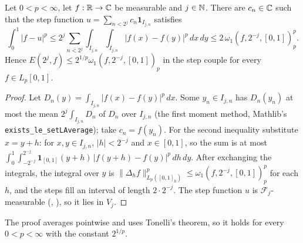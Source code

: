 \begin{lemma}
\label{lem:step-jackson-below-one}
\leanok
{}
Let $0 < p < \infty$, let $f : \mathbb{R} \to \mathbb{C}$ be measurable and $j \in \mathbb{N}$. There are $c_n \in \mathbb{C}$
such that the step function $u = \sum_{n < 2^j} c_n \mathbf{1}_{I_{j,n}}$ satisfies
\[
  \int_0^1 |f - u|^p \leq 2^j \sum_{n < 2^j} \int_{I_{j,n}} \int_{I_{j,n}} |f(x) - f(y)|^p
  \, dx \, dy \leq 2 \, \omega_1(f, 2^{-j}, [0, 1])_p^p .
\]
Hence $E(2^j, f) \leq 2^{1/p} \omega_1(f, 2^{-j}, [0, 1])_p$ in the step couple for every
$f \in L_p[0, 1]$.
\end{lemma}

\begin{proof}
\leanok
Let $D_n(y) = \int_{I_{j,n}} |f(x) - f(y)|^p \, dx$. Some $y_n \in I_{j,n}$ has $D_n(y_n)$ at most
the mean $2^j \int_{I_{j,n}} D_n$ of $D_n$ over $I_{j,n}$ (the first moment method, Mathlib's
\texttt{exists\_\allowbreak le\_\allowbreak setLAverage}); take $c_n = f(y_n)$. For the second
inequality substitute $x = y + h$: for $x, y \in I_{j,n}$, $|h| < 2^{-j}$ and $x \in [0, 1]$, so
the sum is at most
$\int_0^1 \int_{-2^{-j}}^{2^{-j}} \mathbf{1}_{[0, 1]}(y + h) \, |f(y + h) - f(y)|^p \, dh \, dy$.
After exchanging the integrals, the integral over $y$ is $\|\Delta_h f\|_{L_p([0, 1]_h)}^p \leq
\omega_1(f, 2^{-j}, [0, 1])_p^p$ for each $h$, and the steps fill an interval of length
$2 \cdot 2^{-j}$. The step function $u$ is $\mathcal{F}_j$-measurable
(, ), so it lies in $V_j$.
\end{proof}

The proof averages pointwise and uses Tonelli's theorem, so it holds for every
$0 < p < \infty$ with the constant $2^{1/p}$.

